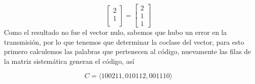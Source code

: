 \begin{itemize}
\begin{sols}
$$\begin{bmatrix}
            2\\
            1\\
        \end{bmatrix}=\begin{bmatrix}
            2\\
            1\\
            1
        \end{bmatrix}$$
        Como el resultado no fue el vector nulo, sabemos que hubo un error en la transmisión, por lo que tenemos que determinar la coclase del vector, para esto primero calculemos las palabras que pertenecen al código, nuevamente las filas de la matriz sistemática generan el código, así

        $$C=\langle100211,010112,001110\rangle$$ 
    \end{sols}
\end{itemize}
